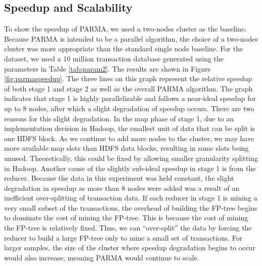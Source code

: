
\subsection{Speedup and Scalability}
To show the speedup of PARMA, we used a two-nodes cluster as the
baseline. Because PARMA is intended to be a parallel algorithm, the choice of a
two-nodes cluster was more appropriate than the standard single node
baseline. For the dataset, we used a 10 million transaction database
generated using the parameters in Table \ref{tab:param2}. The results
are shown in Figure \ref{fig:parmaspeedup}. The three lines on this graph
represent the relative speedup of both stage 1 and stage 2 as well as
the overall PARMA algorithm. The graph indicates that stage 1 is highly
parallelizable and follows a near-ideal speedup for up to 8 nodes,
after which a slight degradation of speedup occurs. There are two
reasons for this slight degradation. In the map phase of stage 1, due
to an implementation decision in Hadoop, the smallest unit of data
that can be split is one HDFS block. As we continue to add more nodes
to the cluster, we may have more available map slots than HDFS data
blocks, resulting in some slots being unused. Theoretically, this
could be fixed by allowing smaller granularity splitting in
Hadoop. Another cause of the slightly sub-ideal speedup in stage 1 is
from the reducer. Because the data in this experiment was held
constant, the slight degradation in speedup as more than 8 nodes were
added was a result of an inefficient over-splitting of transaction
data. If each reducer in stage 1 is mining a very small subset of the
transactions, the overhead of building the FP-tree begins to dominate
the cost of mining the FP-tree. This is because the cost of mining the
FP-tree is relatively fixed. Thus, we can ``over-split'' the data by
forcing the reducer to build a large FP-tree only to mine a small set
of transactions. For larger samples, the size of the cluster where
speedup degradation begins to occur would also increase, meaning PARMA
would continue to scale.

